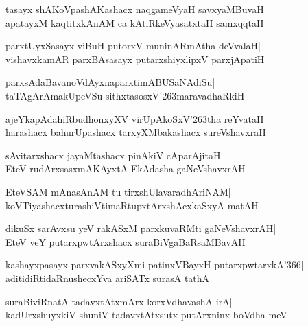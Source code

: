 \documentclass[twoside,12pt,openright]{book}
\def\S{\char'263}
\newcounter{shloka}[chapter]
\begin{document}
\begin{shloka}%
tasayx shAKoVpashAKashacx naqgameVyaH savxyaMBuvaH|\\
apatayxM kaqtitxkAnAM ca kAtiRkeVyasatxtaH samxqqtaH
\end{shloka}

\begin{shloka}%
parxtUyxSasayx viBuH putorxV muninARmAtha deVvalaH|\\
vishavxkamAR parxBAsasayx putarxshiyxlipxV parxjApatiH
\end{shloka}

\begin{shloka}%
parxsAdaBavanoVdAyxnaparxtimABUSaNAdiSu|\\
taTAgArAmakUpeVSu sithxtasosxV\S maravadhaRkiH
\end{shloka}

\begin{shloka}%
ajeYkapAdahiRbudhonxyXV virUpAkoSxV\S tha reYvataH|\\
harashacx bahurUpashacx tarxyXMbakashacx sureVshavxraH
\end{shloka}

\begin{shloka}%
sAvitarxshacx jayaMtashacx pinAkiV cAparAjitaH|\\
EteV rudArxsasxmAKAyxtA EkAdasha gaNeVshavxrAH
\end{shloka}

\begin{shloka}%
EteVSAM mAnasAnAM tu tirxshUlavaradhAriNAM|\\
koVTiyashacxturashiVtimaRtupxtArxshAcxkaSxyA matAH
\end{shloka}

\begin{shloka}%
dikuSx sarAvxsu yeV rakASxM parxkuvaRMti gaNeVshavxrAH|\\
EteV veY putarxpwtArxshacx suraBiVgaBaRsaMBavAH
\end{shloka}

\begin{shloka}%
kashayxpasayx parxvakASxyXmi patinxVBayxH putarxpwtarxkA\char'366|\\
aditidiRtidaRnushecxYva ariSATx surasA tathA
\end{shloka}

\begin{shloka}%
suraBiviRnatA tadavxtAtxmArx korxVdhavashA irA|\\
kadUrxshuyxkiV shuniV tadavxtAtxsutx putArxninx boVdha meV
\end{shloka}
\end{document}
